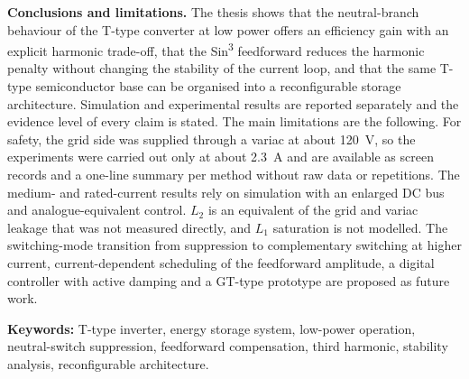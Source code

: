 \textbf{Conclusions and limitations.} The thesis shows that the neutral-branch behaviour of the T-type converter at low power offers an efficiency gain with an explicit harmonic trade-off, that the Sin\textsuperscript{3} feedforward reduces the harmonic penalty without changing the stability of the current loop, and that the same T-type semiconductor base can be organised into a reconfigurable storage architecture. Simulation and experimental results are reported separately and the evidence level of every claim is stated. The main limitations are the following. For safety, the grid side was supplied through a variac at about 120~V, so the experiments were carried out only at about 2.3~A and are available as screen records and a one-line summary per method without raw data or repetitions. The medium- and rated-current results rely on simulation with an enlarged DC bus and analogue-equivalent control. $L_2$ is an equivalent of the grid and variac leakage that was not measured directly, and $L_1$ saturation is not modelled. The switching-mode transition from suppression to complementary switching at higher current, current-dependent scheduling of the feedforward amplitude, a digital controller with active damping and a GT-type prototype are proposed as future work.

\textbf{Keywords:} T-type inverter, energy storage system, low-power operation, neutral-switch suppression, feedforward compensation, third harmonic, stability analysis, reconfigurable architecture.
\endgroup
